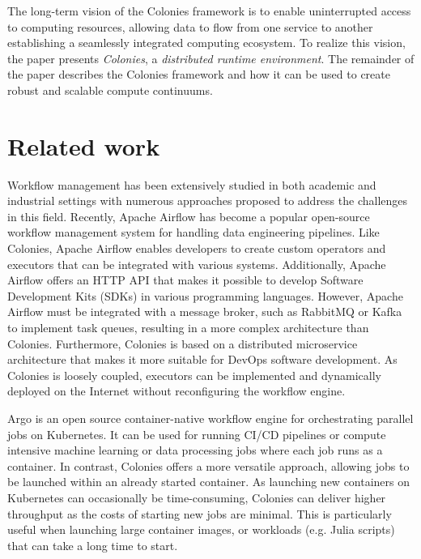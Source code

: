 \documentclass{article}
\begin{document}
The long-term vision of the Colonies framework is to enable uninterrupted access to computing resources, allowing data to flow from one service to another establishing a seamlessly integrated computing ecosystem. To realize this vision, the paper presents \emph{Colonies}, a \emph{distributed runtime environment}. The remainder of the paper describes the Colonies framework and how it can be used to create robust and scalable compute continuums. 

\section{Related work}
Workflow management has been extensively studied in both academic and industrial settings with numerous approaches \cite{scafe, synapse, service_wfs, schmitt2022workflow, GarciaRepresa1740746, Ouyang2010, NIKOLOV2021100440, workflow_in_bigdata} proposed to address the challenges in this field. Recently, Apache Airflow \cite{apache_airflow} has become a popular open-source workflow management system for handling data engineering pipelines. Like Colonies, Apache Airflow enables developers to create custom operators and executors that can be integrated with various systems. Additionally, Apache Airflow offers an HTTP API that makes it possible to develop Software Development Kits (SDKs) in various programming languages. However, Apache Airflow must be integrated with a message broker, such as RabbitMQ \cite{rabbitmq} or Kafka \cite{apache_kafka} to implement task queues, resulting in a more complex architecture than Colonies. Furthermore, Colonies is based on a distributed microservice architecture that makes it more suitable for DevOps software development. As Colonies is loosely coupled, executors can be implemented and dynamically deployed on the Internet without reconfiguring the workflow engine.

Argo \cite{argowf} is an open source container-native workflow engine for orchestrating parallel jobs on Kubernetes. It can be used for running CI/CD pipelines or compute intensive machine learning or data processing jobs where each job runs as a container. In contrast, Colonies offers a more versatile approach, allowing jobs to be launched within an already started container. As launching new containers on Kubernetes can occasionally be time-consuming, Colonies can deliver higher throughput as the costs of starting new jobs are minimal. This is particularly useful when launching large container images, or workloads (e.g. Julia scripts) that can take a long time to start. 
\end{document}
